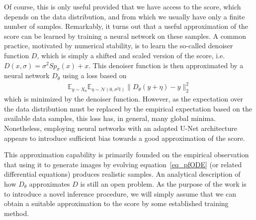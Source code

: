 \documentclass{article}
\def\eqref#1{equation~\ref{#1}}
\newcommand{\E}{\mathbb{E}}
\theoremstyle{plain}
\theoremstyle{definition}
\theoremstyle{remark}
\newcommand{\cN}{\mathcal{N}}
\begin{document}
Of course, this is only useful provided that we have access to the score, which depends on the data distribution, and from which we usually  have only a finite number of samples. Remarkably, it turns out that a useful approximation of the score can be learned by training a neural network on these samples.
A common practice, motivated by numerical stability, is to learn the so-called denoiser function $D$, which is simply a shifted and scaled version of the score, i.e.\@ $D(x,\sigma) = \sigma^2 Sp_\sigma(x) + x$. This denoiser function is then approximated by a neural network $D_\theta$ using a loss based on
\begin{align*}
    \E_{y\sim X_0}\E_{\eta \sim \cN(0,\sigma^2\mathbb{I})}\|D_\theta(y + \eta)-y\|^2_2
\end{align*}
which is minimized by the denoiser function. However, as the expectation over the data distribution must be replaced by the empirical expectation based on the available data samples, this loss has, in general, many global minima. Nonetheless, employing neural networks with an adapted U-Net architecture \citep{unet1,ho2020denoising,unet2} appears to introduce sufficient bias towards a good approximation of the score. 

This approximation capability is primarily founded on the empirical observation that using it to generate images by evolving \eqref{eq_pfODE} (or related differential equations) produces realistic samples. An analytical description of how $D_\theta$ approximates $D$ is still an open problem. As the purpose of the work is to introduce a novel inference procedure, we will simply assume that we can obtain a suitable approximation to the score by some established training method.
\end{document}
